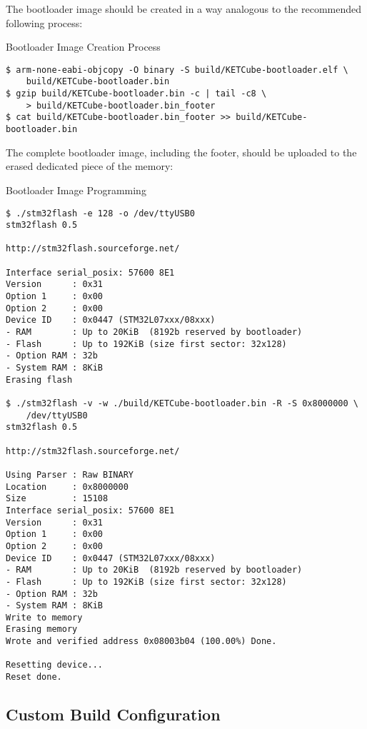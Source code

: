 The bootloader image should be created in a way analogous to the recommended following process:

\begin{docCodeExampleTitled}{Bootloader Image Creation Process}
\begin{verbatim}
$ arm-none-eabi-objcopy -O binary -S build/KETCube-bootloader.elf \
    build/KETCube-bootloader.bin
$ gzip build/KETCube-bootloader.bin -c | tail -c8 \
    > build/KETCube-bootloader.bin_footer
$ cat build/KETCube-bootloader.bin_footer >> build/KETCube-bootloader.bin
\end{verbatim}
\end{docCodeExampleTitled}


The complete bootloader image, including the footer, should be uploaded to the erased dedicated piece of the memory:

\begin{docCodeExampleTitled}{Bootloader Image Programming}
\begin{verbatim}
$ ./stm32flash -e 128 -o /dev/ttyUSB0
stm32flash 0.5

http://stm32flash.sourceforge.net/

Interface serial_posix: 57600 8E1
Version      : 0x31
Option 1     : 0x00
Option 2     : 0x00
Device ID    : 0x0447 (STM32L07xxx/08xxx)
- RAM        : Up to 20KiB  (8192b reserved by bootloader)
- Flash      : Up to 192KiB (size first sector: 32x128)
- Option RAM : 32b
- System RAM : 8KiB
Erasing flash

$ ./stm32flash -v -w ./build/KETCube-bootloader.bin -R -S 0x8000000 \
    /dev/ttyUSB0
stm32flash 0.5

http://stm32flash.sourceforge.net/

Using Parser : Raw BINARY
Location     : 0x8000000
Size         : 15108
Interface serial_posix: 57600 8E1
Version      : 0x31
Option 1     : 0x00
Option 2     : 0x00
Device ID    : 0x0447 (STM32L07xxx/08xxx)
- RAM        : Up to 20KiB  (8192b reserved by bootloader)
- Flash      : Up to 192KiB (size first sector: 32x128)
- Option RAM : 32b
- System RAM : 8KiB
Write to memory
Erasing memory
Wrote and verified address 0x08003b04 (100.00%) Done.

Resetting device... 
Reset done.
\end{verbatim}
\end{docCodeExampleTitled}

\subsection{Custom Build Configuration}\label{sec:arch:CustBuildConfig}

